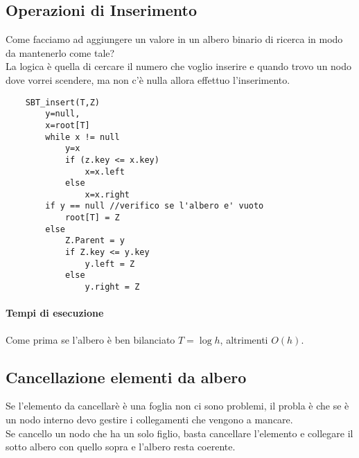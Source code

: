 \subsection{Operazioni di Inserimento}
Come facciamo ad aggiungere un valore in un albero binario di ricerca in modo
da mantenerlo come tale?\\
La logica è quella di cercare il numero che voglio inserire e quando trovo un nodo
dove vorrei scendere, ma non c'è nulla allora effettuo l'inserimento.
\begin{lstlisting}
    SBT_insert(T,Z)
        y=null,
        x=root[T]
        while x != null
            y=x
            if (z.key <= x.key)
                x=x.left
            else
                x=x.right
        if y == null //verifico se l'albero e' vuoto
            root[T] = Z
        else
            Z.Parent = y
            if Z.key <= y.key
                y.left = Z
            else
                y.right = Z
\end{lstlisting}
\paragraph*{Tempi di esecuzione} Come prima se l'albero è ben bilanciato $T=\log h$, altrimenti
$O(h)$.
\subsection{Cancellazione elementi da albero}
Se l'elemento da cancellarè è una foglia non ci sono problemi, il probla è che se è un nodo
interno devo gestire i collegamenti che vengono a mancare.\\
Se cancello un nodo che ha un solo figlio, basta cancellare l'elemento e collegare il sotto
albero con quello sopra e l'albero resta coerente.\\
